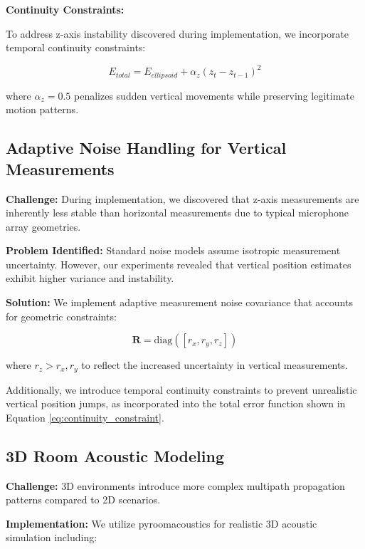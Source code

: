 \documentclass[a4paper]{article}
\begin{document}
{\bf Continuity Constraints:}

To address z-axis instability discovered during implementation, we incorporate temporal continuity constraints:

\begin{equation}
E_{total} = E_{ellipsoid} + \alpha_z (z_t - z_{t-1})^2
\label{eq:continuity_constraint}
\end{equation}

where $\alpha_z = 0.5$ penalizes sudden vertical movements while preserving legitimate motion patterns.

\subsection{Adaptive Noise Handling for Vertical Measurements}

{\bf Challenge:} During implementation, we discovered that z-axis measurements are inherently less stable than horizontal measurements due to typical microphone array geometries.

{\bf Problem Identified:} Standard noise models assume isotropic measurement uncertainty. However, our experiments revealed that vertical position estimates exhibit higher variance and instability.

{\bf Solution:} We implement adaptive measurement noise covariance that accounts for geometric constraints:

\begin{equation}
\mathbf{R} = \text{diag}([r_x, r_y, r_z])
\label{eq:measurement_noise}
\end{equation}

where $r_z > r_x, r_y$ to reflect the increased uncertainty in vertical measurements.

Additionally, we introduce temporal continuity constraints to prevent unrealistic vertical position jumps, as incorporated into the total error function shown in Equation \ref{eq:continuity_constraint}.

\subsection{3D Room Acoustic Modeling}

{\bf Challenge:} 3D environments introduce more complex multipath propagation patterns compared to 2D scenarios.

{\bf Implementation:} We utilize pyroomacoustics \cite{pyroomacoustics} for realistic 3D acoustic simulation including:
\end{document}
